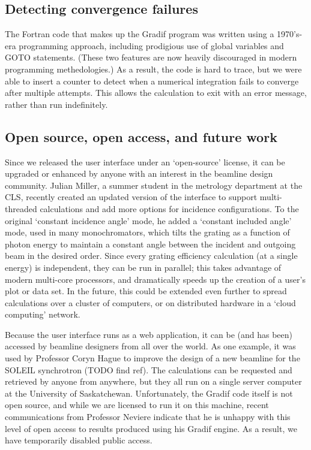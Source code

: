 \subsection{Detecting convergence failures}
The Fortran code that makes up the Gradif program was written using a 1970's-era programming approach, including prodigious use of global variables and GOTO statements.  (These two features are now heavily discouraged in modern programming methedologies.)  As a result, the code is hard to trace, but we were able to insert a counter to detect when a numerical integration fails to converge after multiple attempts.  This allows the calculation to exit with an error message, rather than run indefinitely.

\subsection{Open source, open access, and future work}
Since we released the user interface under an `open-source' license, it can be upgraded or enhanced by anyone with an interest in the beamline design community.  Julian Miller, a summer student in the metrology department at the CLS, recently created an updated version of the interface to support multi-threaded calculations and add more options for incidence configurations.  To the original `constant incidence angle' mode, he added a `constant included angle' mode, used in many monochromators, which tilts the grating as a function of photon energy to maintain a constant angle between the incident and outgoing beam in the desired order.  Since every grating efficiency calculation (at a single energy) is independent, they can be run in parallel; this takes advantage of modern multi-core processors, and dramatically speeds up the creation of a user's plot or data set.  In the future, this could be extended even further to spread calculations over a cluster of computers, or on distributed hardware in a `cloud computing' network.

Because the user interface runs as a web application, it can be (and has been) accessed by beamline designers from all over the world.  As one example, it was used by Professor Coryn Hague to improve the design of a new beamline for the SOLEIL synchrotron (TODO find ref).  The calculations can be requested and retrieved by anyone from anywhere, but they all run on a single server computer at the University of Saskatchewan.  Unfortunately, the Gradif code itself is not open source, and while we are licensed to run it on this machine, recent communications from Professor Neviere indicate that he is unhappy with this level of open access to results produced using his Gradif engine.  As a result, we have temporarily disabled public access.

